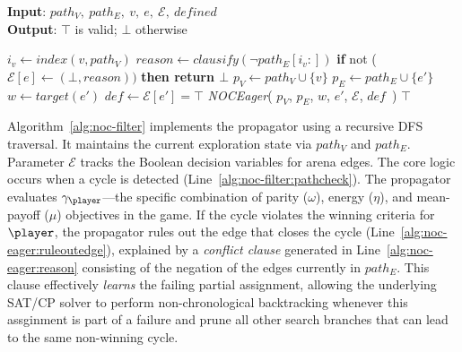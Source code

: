 \documentclass[a4paper,UKenglish,cleveref, autoref, thm-restate, anonymous]{lipics-v2021}
\begin{document}
\begin{algorithm}[htb]
\small
\caption{\textbf{\textit{NOCFilter}}}
\textbf{Input}: $path_V,\ path_E,\ v,\ e,\ \mathcal{E},\ \textit{defined}$ \\
\textbf{Output}: $\top$ is valid; $\bot$ otherwise
\begin{algorithmic}[1]
     \label{alg:noc-filter:pathcheck}
        \STATE $i_v \gets \textit{index}(v, path_V)$
        \IF{$\neg \gamma_{\player}$} \label{alg:noc-filter:condition}
            \STATE $\textit{reason} \gets \textit{clausify}(\neg path_E[i_v:])$ \label{alg:noc-eager:reason}
            \STATE \textbf{if }not ($\mathcal{E}[e] \gets (\bot, \textit{reason}))$ \textbf{then return $\bot$} \label{alg:noc-eager:ruleoutedge}
        \ENDIF
     \label{alg:noc-eager:defcheck}
         \label{alg:no-opponent-cycle-f1:edgecheck}
            \STATE $p_V \gets path_V \cup \{v\}$
            \STATE $p_E \gets path_E \cup \{e'\}$
            \STATE $w \gets \textit{target}(e')$
            \STATE $\textit{def} \gets \mathcal{E}[e'] = \top$
            \STATE \textit{NOCEager}(
                $p_V$,
                $p_E$,
                $w$,
                $e'$,
                $\mathcal{E}$,
                $\textit{def}$\ )
        \ENDFOR
    \ENDIF
    \RETURN $\top$
\end{algorithmic}
\label{alg:noc-filter}
\end{algorithm}

Algorithm~\ref{alg:noc-filter} implements the \noc propagator using a recursive DFS traversal. It maintains the current exploration state via $path_V$ and $path_E$. Parameter $\mathcal{E}$ tracks the Boolean decision variables for arena edges. The core logic occurs when a cycle is detected (Line~\ref{alg:noc-filter:pathcheck}). The propagator evaluates $\gamma_{\player}$---the specific combination of parity ($\omega$), energy ($\eta$), and mean-payoff ($\mu$) objectives in the game. 
%
If the cycle violates the winning criteria for $\player$, the propagator rules out the edge that closes the cycle (Line~\ref{alg:noc-eager:ruleoutedge}), explained by a \textit{conflict clause} generated in Line~\ref{alg:noc-eager:reason} consisting of the negation of the edges currently in $path_E$. This clause effectively {\em learns} the failing partial assignment, allowing the underlying SAT/CP solver to perform non-chronological backtracking whenever this assginment is part of a failure and prune all other search branches that can lead to the same non-winning cycle.
\end{document}
